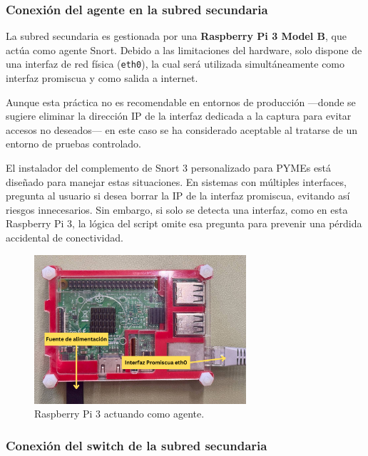 \documentclass[11pt,a4paper,twoside]{report}
\begin{document}
\subsubsection{Conexión del agente en la subred secundaria}

La subred secundaria es gestionada por una \textbf{Raspberry Pi 3 Model B}, que actúa como agente Snort. Debido a las limitaciones del hardware, solo dispone de una interfaz de red física (\texttt{eth0}), la cual será utilizada simultáneamente como interfaz promiscua y como salida a internet.\newline

Aunque esta práctica no es recomendable en entornos de producción —donde se sugiere eliminar la dirección IP de la interfaz dedicada a la captura para evitar accesos no deseados— en este caso se ha considerado aceptable al tratarse de un entorno de pruebas controlado.\newline

El instalador del complemento de Snort 3 personalizado para PYMEs está diseñado para manejar estas situaciones. En sistemas con múltiples interfaces, pregunta al usuario si desea borrar la IP de la interfaz promiscua, evitando así riesgos innecesarios. Sin embargo, si solo se detecta una interfaz, como en esta Raspberry Pi 3, la lógica del script omite esa pregunta para prevenir una pérdida accidental de conectividad.

\begin{figure}[H]
	\centering
	\includegraphics[width=0.7\textwidth]{install/0.3.png}
	\caption{Raspberry Pi 3 actuando como agente.}
	\label{fig:conexion-agente-rpi3}
\end{figure}


\subsubsection{Conexión del switch de la subred secundaria}
\end{document}
